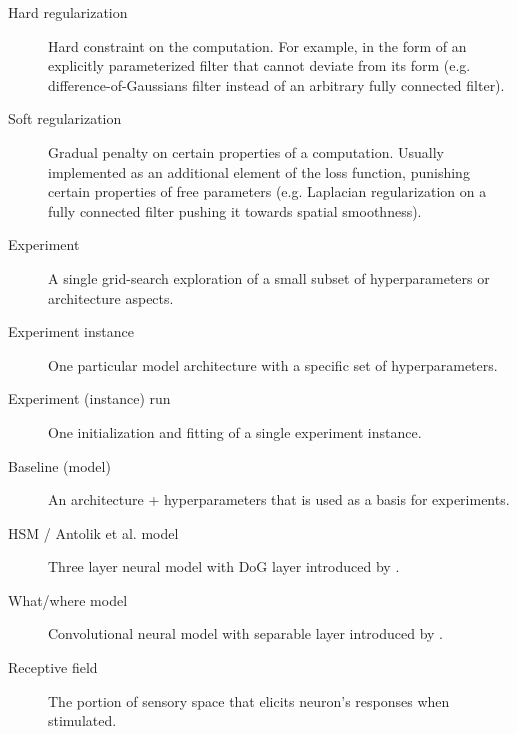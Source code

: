 
\begin{description}
	
	\item[Hard regularization] Hard constraint on the computation. For example, in the form of an explicitly parameterized filter that cannot deviate from its form (e.g. difference-of-Gaussians filter instead of an arbitrary fully connected filter).
	
	\item[Soft regularization] Gradual penalty on certain properties of a computation. Usually implemented as an additional element of the loss function, punishing certain properties of free parameters (e.g. Laplacian regularization on a fully connected filter pushing it towards spatial smoothness).
	
	\item[Experiment] A single grid-search exploration of a small subset of hyperparameters or architecture aspects.
	
	\item[Experiment instance] One particular model architecture with a specific set of hyperparameters.
	
	\item[Experiment (instance) run] One initialization and fitting of a single experiment instance.
	
	\item[Baseline (model)] An architecture + hyperparameters that is used as a basis for experiments.
	
	\item[HSM / Antolik et al. model] Three layer neural model with DoG layer introduced by \cite{antolik}.

	\item[What/where model] Convolutional neural model with separable layer introduced by \cite{klidnt}.

	\item[Receptive field] The portion of sensory space that elicits neuron’s responses when stimulated.

\end{description}


